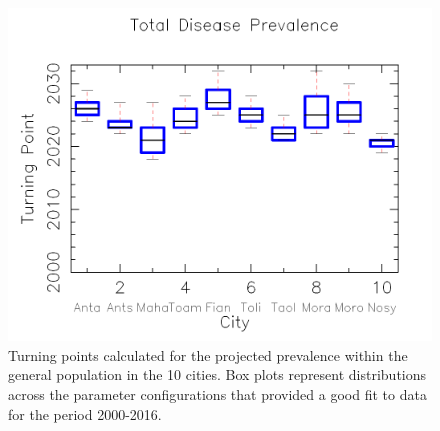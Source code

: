 \documentclass[preprint,12pt]{elsarticle}
\begin{document}
\begin{figure}
\vspace{-1.0cm}
\includegraphics[width=\linewidth,angle=0]{boxplot-Total-Prevalence-Sigmoidal.pdf}
\caption{Turning points calculated for the projected prevalence within the general population in the 10 cities. Box plots represent distributions across the parameter configurations that provided a good fit to data for the period 2000-2016.}
\label{Fig_Turning_Points}
\end{figure}
\end{document}
